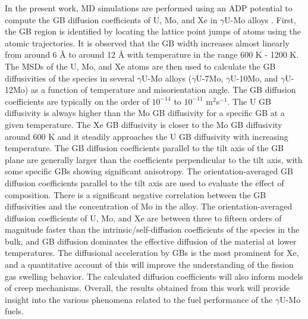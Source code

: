 \documentclass{elsarticle}
\begin{document}
In the present work, MD simulations are performed using an ADP potential to compute the GB diffusion coefficients of U, Mo, and Xe in $\gamma$U-Mo alloys \cite{starikov2018}. First, the GB region is identified by locating the lattice point jumps of atoms using the atomic trajectories. It is observed that the GB width increases almost linearly from around 6 \r{A} to around 12 \r{A} with temperature in the range 600 K - 1200 K. The MSDs of the U, Mo, and Xe atoms are then used to calculate the GB diffusivities of the species in several $\gamma$U-Mo alloys ($\gamma$U-7Mo, $\gamma$U-10Mo, and $\gamma$U-12Mo) as a function of temperature and misorientation angle. The GB diffusion coefficients are typically on the order of $10^{-14}$ to $10^{-11}$ m$^2$s$^{-1}$. The U GB diffusivity is always higher than the Mo GB diffusivity for a specific GB at a given temperature. The Xe GB diffusivity is closer to the Mo GB diffusivity around 600 K and it steadily approaches the U GB diffusivity with increasing temperature. The GB diffusion coefficients parallel to the tilt axis of the GB plane are generally larger than the coefficients perpendicular to the tilt axis, with some specific GBs showing significant anisotropy. The orientation-averaged GB diffusion coefficients parallel to the tilt axis are used to evaluate the effect of composition. There is a significant negative correlation between the GB diffusivities and the concentration of Mo in the alloy. The orientation-averaged diffusion coefficients of U, Mo, and Xe are between three to fifteen orders of magnitude faster than the intrinsic/self-diffusion coefficients of the species in the bulk, and GB diffusion dominates the effective diffusion of the material at lower temperatures. The diffusional acceleration by GBs is the most prominent for Xe, and a quantitative account of this will improve the understanding of the fission gas swelling behavior. The calculated diffusion coefficients will also inform models of creep mechanisms. Overall, the results obtained from this work will provide insight into the various phenomena related to the fuel performance of the $\gamma$U-Mo fuels.
\end{document}
